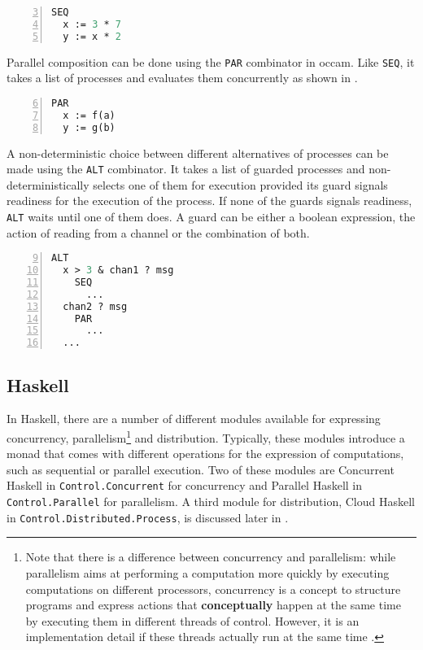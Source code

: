 \begin{lstlisting}[language=Caml, caption=Sequential composition of processes in \textsf{occam}., label=lst:occam_seq, numbers=left, frame=bt, firstnumber=3]
SEQ
  x := 3 * 7
  y := x * 2
\end{lstlisting}

Parallel composition can be done using the \texttt{PAR} combinator in \textsf{occam}. Like \texttt{SEQ}, it takes a list of processes and evaluates them concurrently as shown in .

\begin{lstlisting}[language=Caml, caption=Parallel composition of processes in \textsf{occam}., label=lst:occam_par, numbers=left, frame=bt, firstnumber=6]
PAR
  x := f(a)
  y := g(b)
\end{lstlisting}

A non-deterministic choice between different alternatives of processes can be made using the \texttt{ALT} combinator. It takes a list of guarded processes and non-deterministically selects one of them for execution provided its guard signals readiness for the execution of the process. If none of the guards signals readiness, \texttt{ALT} waits until one of them does. A guard can be either a boolean expression, the action of reading from a channel or the combination of both.

\begin{lstlisting}[language=Caml, caption=Choice between process alternatives in \textsf{occam}., label=lst:occam_par, numbers=left, frame=bt, firstnumber=9]
ALT
  x > 3 & chan1 ? msg
    SEQ
      ...
  chan2 ? msg
    PAR
      ...
  ...
\end{lstlisting}

\subsection{Haskell}
In \textsf{Haskell}, there are a number of different modules available for expressing concurrency, parallelism\footnote{Note that there is a difference between concurrency and parallelism: while parallelism aims at performing a computation more quickly by executing computations on different processors, concurrency is a concept to structure programs and express actions that \textbf{conceptually} happen at the same time by executing them in different threads of control. However, it is an implementation detail if these threads actually run at the same time \cite{Marlow}.} and distribution. Typically, these modules introduce a monad that comes with different operations for the expression of computations, such as sequential or parallel execution. Two of these modules are \textsf{Concurrent Haskell} in \texttt{Control.Concurrent} for concurrency and \textsf{Parallel Haskell} in \texttt{Control.Parallel} for parallelism. A third module for distribution, \textsf{Cloud Haskell} in \texttt{Control.Distributed.Process}, is discussed later in .

